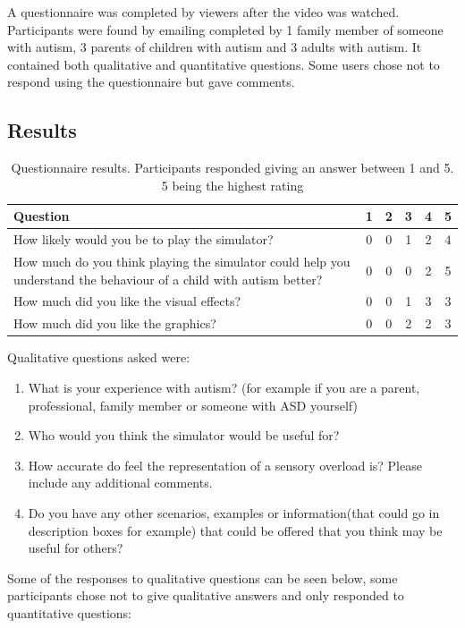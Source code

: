 \documentclass[11pt]{report}
\begin{document}
A questionnaire was completed by viewers after the video was watched. Participants were found by emailing completed by 1 family member of someone with autism, 3 parents of children with autism and 3 adults with autism. It contained both qualitative and quantitative questions. Some users chose not to respond using the questionnaire but gave comments. 

\subsection{Results}

\begin{table}[H]
\caption{Questionnaire results. Participants responded giving an answer between 1 and 5. 5 being the highest rating}
\begin{tabular}{| p{9cm} | c c c c c |}
\hline
\textbf{Question} & 1 & 2 & 3 & 4 & 5 \\
\hline
How likely would you be to play the simulator? & 0 & 0 & 1 & 2 & 4 \\
\hline
How much do you think playing the simulator could help you understand the behaviour of a child with autism better? & 0 & 0 & 0 & 2 & 5 \\
\hline
How much did you like the visual effects? & 0 & 0 & 1 & 3 & 3 \\
\hline
How much did you like the graphics? & 0 & 0 & 2 & 2 & 3 \\ 
\hline
\end{tabular}
\end{table}

Qualitative questions asked were:
\begin{enumerate}
\item What is your experience with autism? (for example if you are a parent, professional, family member or someone with ASD yourself)
\item Who would you think the simulator would be useful for?
\item How accurate do feel the representation of a sensory overload is? Please include any additional comments.
\item Do you have any other scenarios, examples or information(that could go in description boxes for example) that could be offered that you think may be useful for others?
\end{enumerate}

Some of the responses to qualitative questions can be seen below, some participants chose not to give qualitative answers and only responded to quantitative questions:
\end{document}
